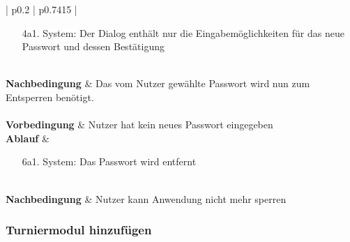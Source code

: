 \documentclass[11pt]{article}
\begin{document}
\begin{tabularx}{\textwidth}{| p{} | p{} |}
\begin{enumerate}
			\item[4a1.] System: Der Dialog enthält nur die Eingabemöglichkeiten für das neue Passwort und dessen Bestätigung
		\end{enumerate}
	\\
	\hline
	\textbf{Nachbedingung} & Das vom Nutzer gewählte Passwort wird nun zum Entsperren benötigt. \\
	\hline
	 \\
	\hline
	\textbf{Vorbedingung} & Nutzer hat kein neues Passwort eingegeben \\
	\hline
	\textbf{Ablauf} &
		\begin{enumerate}
			\item[6a1.] System: Das Passwort wird entfernt
		\end{enumerate}
	\\
	\hline
	\textbf{Nachbedingung} & Nutzer kann Anwendung nicht mehr sperren \\
	\hline
\end{tabularx}

\newpage

\subsubsection{Turniermodul hinzufügen}
\end{document}
